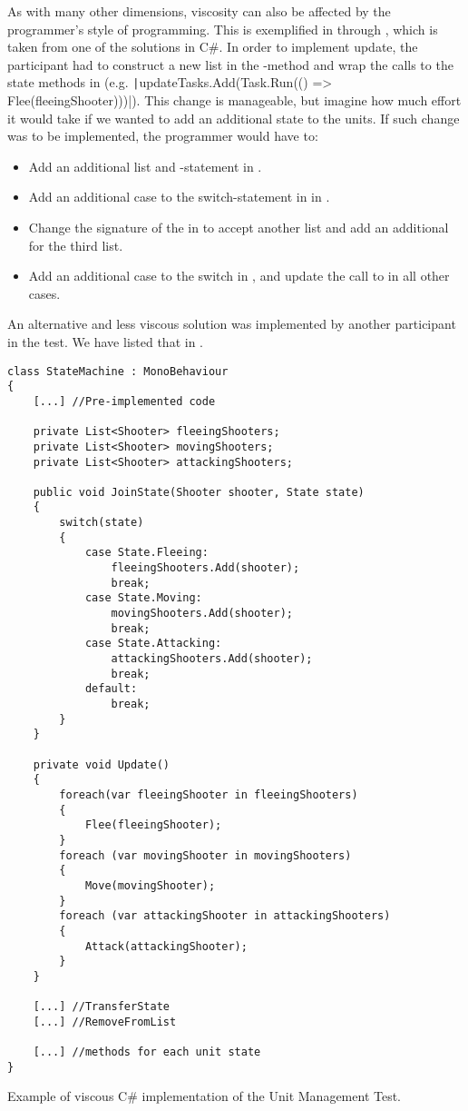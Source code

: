 As with many other dimensions, viscosity can also be affected by the programmer's style of programming. This is exemplified in  through , which is taken from one of the solutions in C\#. In order to implement  update, the participant had to construct a new list in the -method and wrap the calls to the state methods in  (e.g. \texttt|updateTasks.Add(Task.Run(() => Flee(fleeingShooter)))|). This change is manageable, but imagine how much effort it would take if we wanted to add an additional state to the units. If such change was to be implemented, the programmer would have to:
\begin{itemize}
    \item Add an additional list and -statement in .
    \item Add an additional case to the switch-statement in  in .
    \item Change the signature of the  in  to accept another list and add an additional  for the third list.
    \item Add an additional case to the switch in , and update the call to  in all other cases.
\end{itemize}
An alternative and less viscous solution was implemented by another participant in the test. We have listed that in .

\begin{listing}[H]
    \begin{verbatim}
class StateMachine : MonoBehaviour
{
    [...] //Pre-implemented code

    private List<Shooter> fleeingShooters;
    private List<Shooter> movingShooters;
    private List<Shooter> attackingShooters;

    public void JoinState(Shooter shooter, State state)
    {
        switch(state)
        {
            case State.Fleeing:
                fleeingShooters.Add(shooter);
                break;
            case State.Moving:
                movingShooters.Add(shooter);
                break;
            case State.Attacking:
                attackingShooters.Add(shooter);
                break;
            default:
                break;
        }
    }

    private void Update()
    {
        foreach(var fleeingShooter in fleeingShooters)
        {
            Flee(fleeingShooter);
        }
        foreach (var movingShooter in movingShooters)
        {
            Move(movingShooter);
        }
        foreach (var attackingShooter in attackingShooters)
        {
            Attack(attackingShooter);
        }
    }

    [...] //TransferState
    [...] //RemoveFromList

    [...] //methods for each unit state
}
    \end{verbatim}
    \caption{Example of viscous C\# implementation of the Unit Management Test.}
    \label{lst:csharp:viscous}
\end{listing}

